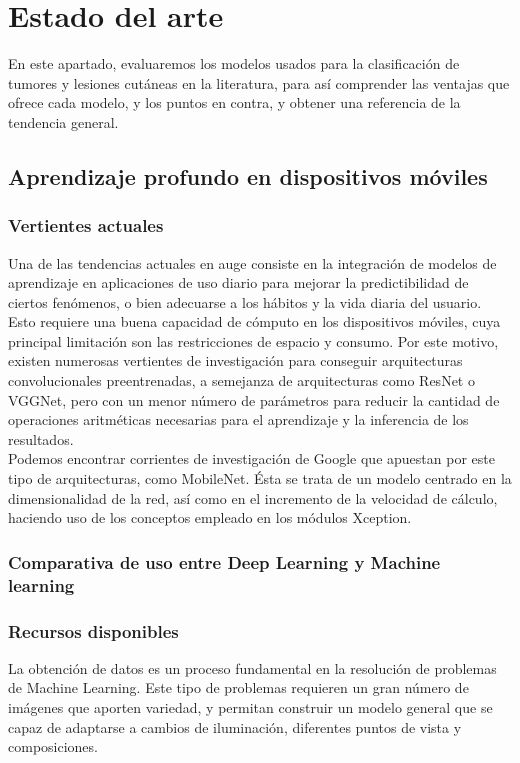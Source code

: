 \chapter{Estado del arte}

En este apartado, evaluaremos los modelos usados para la clasificación de tumores y lesiones cutáneas en la literatura, para así comprender las ventajas que ofrece cada modelo, y los puntos en contra, y obtener una referencia de la tendencia general.

\section{Aprendizaje profundo en dispositivos móviles}
\subsection{Vertientes actuales}
Una de las tendencias actuales en auge consiste en la integración de modelos de aprendizaje en aplicaciones de uso diario para mejorar la predictibilidad de ciertos fenómenos, o bien adecuarse a los hábitos y la vida diaria del usuario. Esto requiere una buena capacidad de cómputo en los dispositivos móviles, cuya principal limitación son las restricciones de espacio y consumo. Por este motivo, existen numerosas vertientes de investigación para conseguir arquitecturas convolucionales preentrenadas, a semejanza de arquitecturas como ResNet o VGGNet, pero con un menor número de parámetros para reducir la cantidad de operaciones aritméticas necesarias para el aprendizaje y la inferencia de los resultados.\\

Podemos encontrar corrientes de investigación de Google que apuestan por este tipo de arquitecturas, como MobileNet. Ésta se trata de un modelo centrado en la dimensionalidad de la red, así como en el incremento de la velocidad de cálculo, haciendo uso de los conceptos empleado en los módulos Xception.
\subsection{Comparativa de uso entre Deep Learning y Machine learning}
\subsection{Recursos disponibles}

La obtención de datos es un proceso fundamental en la resolución de problemas de Machine Learning. Este tipo de problemas requieren un gran número de imágenes que aporten variedad, y permitan construir un modelo general que se capaz de adaptarse a cambios de iluminación, diferentes puntos de vista y composiciones.

